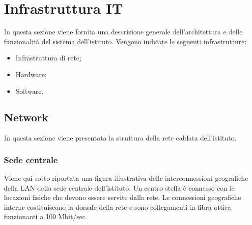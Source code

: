 \documentclass[12pt, a4paper, titlepage]{report}
\begin{document}
	\newpage
	
	\section{Infrastruttura IT}
		In questa sezione viene fornita una descrizione generale dell'architettura e delle funzionalità del sistema dell'istituto. Vengono indicate le seguenti infrastrutture:
		\begin{itemize}
			\item Infrastruttura di rete;
			\item Hardware;
			\item Software.
		\end{itemize}
		\newpage
		\subsection{Network} \label{network}
		
		In questa sezione viene presentata la struttura della rete cablata dell'istituto.
		\subsubsection{Sede centrale}
		
		Viene qui sotto riportata una figura illustrativa delle interconnessioni geografiche della LAN della sede centrale dell'istituto. Un centro-stella è connesso con le locazioni fisiche che devono essere servite dalla rete. Le connessioni geografiche interne costituiscono la dorsale della rete e sono collegamenti in fibra ottica funzionanti a 100 Mbit/sec.
		
\end{document}

